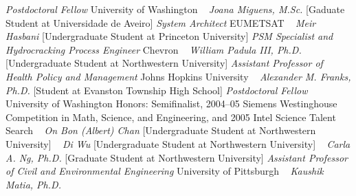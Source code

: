     \textit{Postdoctoral Fellow}
    \newline
    University of Washington
    \newline
~
\Gap{}
\textit{Joana Miguens, M.Sc.}
    [Gaduate Student at Universidade de Aveiro]
\newline
    \textit{System Architect}
    \newline
    EUMETSAT
    \newline
~
\Gap{}
\textit{Meir Hasbani}
    [Undergraduate Student at Princeton University]
\newline
    \textit{PSM Specialist and Hydrocracking Process Engineer}
    \newline
    Chevron
    \newline
~
\Gap{}
\textit{William Padula III, Ph.D.}
    [Undergraduate Student at Northwestern University]
\newline
    \textit{Assistant Professor of Health Policy and Management}
    \newline
    Johns Hopkins University
    \newline
~
\Gap{}
\textit{Alexander M. Franks, Ph.D.}
    [Student at Evanston Township High School]
\newline
    \textit{Postdoctoral Fellow}
    \newline
    University of Washington
    \newline
    {\footnotesize Honors: Semifinalist, 2004--05 Siemens Westinghouse Competition in Math, Science, and Engineering, and 2005 Intel Science Talent Search}
    \newline
~
\Gap{}
\textit{On Bon (Albert) Chan}
    [Undergraduate Student at Northwestern University]
\newline
~
\Gap{}
\textit{Di Wu}
    [Undergraduate Student at Northwestern University]
\newline
~
\Gap{}
\textit{Carla A. Ng, Ph.D.}
    [Graduate Student at Northwestern University]
\newline
    \textit{Assistant Professor of Civil and Environmental Engineering}
    \newline
    University of Pittsburgh
    \newline
~
\Gap{}
\textit{Kaushik Matia, Ph.D.}
